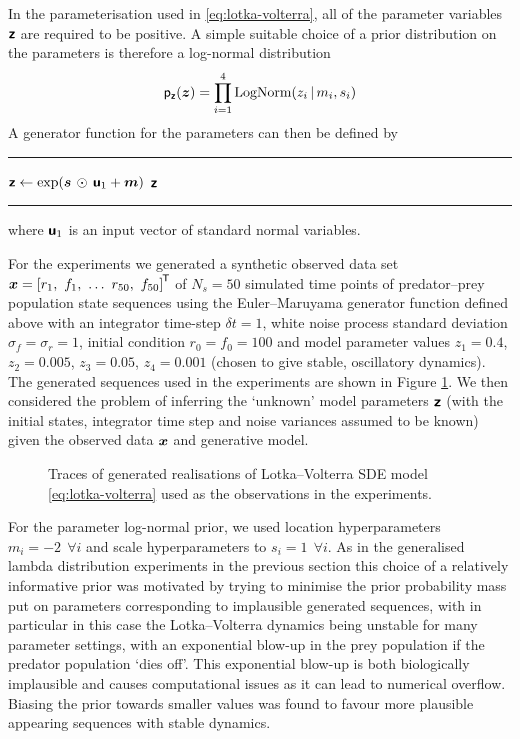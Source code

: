In the parameterisation used in \eqref{eq:lotka-volterra}, all of the parameter variables $\boldsymbol{\mathsf{z}}$ are required to be positive. A simple suitable choice of a prior distribution on the parameters is therefore a log-normal distribution
\begin{equation}
  \mathsf{p}_{\boldsymbol{\mathsf{z}}}(\boldsymbol{z}) = \prod_{i=1}^4 \textrm{LogNorm}(z_i \operatorname{|} m_i, s_i)
\end{equation}
A generator function for the parameters can then be defined by
\vspace{3mm}
\hrule
\begin{algorithmic}
\small
{}
  \State $\boldsymbol{\mathsf{z}} \gets \exp(\boldsymbol{s} \,\odot\, \boldsymbol{\mathsf{u}}_1 + \boldsymbol{m})$
  \State \Return $\boldsymbol{\mathsf{z}}$
\EndFunction
\end{algorithmic}
\vspace{0mm}
\hrule
\vspace{1mm}
where $\boldsymbol{\mathsf{u}}_1$ is an input vector of standard normal variables.

For the experiments we generated a synthetic observed data set $\vct{x} = \lsb r_1, ~ f_1, ~ \dots ~ {r}_{50}, ~ {f}_{50} \rsb\tr$ of $N_s = 50$ simulated time points of predator--prey population state sequences using the Euler--Maruyama generator function defined above with an integrator time-step $\delta t = 1$, white noise process standard deviation $\sigma_f = \sigma_r = 1$, initial condition $r_0 = f_0 = 100$ and model parameter values ${z}_1=0.4$, ${z}_2 = 0.005$,  ${z}_3=0.05$, ${z}_4=0.001$ (chosen to give stable, oscillatory dynamics). The generated sequences used in the experiments are shown in Figure \ref{fig:lotka-volterra-observed-state-seq}. We then considered the problem of inferring the `unknown' model parameters $\boldsymbol{\mathsf{z}}$ (with the initial states, integrator time step and noise variances assumed to be known) given the observed data $\boldsymbol{x}$ and generative model. 

\begin{figure}[t]
\centering
{}
\vspace{-5mm}
\caption[Generated Lotka--Volterra sequences.]{Traces of generated realisations of Lotka--Volterra \ac{SDE} model \eqref{eq:lotka-volterra} used as the observations in the experiments.}
\label{fig:lotka-volterra-observed-state-seq}
\end{figure}

For the parameter log-normal prior, we used location hyperparameters $m_i = -2 ~~\forall i$ and scale hyperparameters to $s_i = 1 ~~\forall i$. As in the generalised lambda distribution experiments in the previous section this choice of a relatively informative prior was motivated by trying to minimise the prior probability mass put on parameters corresponding to implausible generated sequences, with in particular in this case the Lotka--Volterra dynamics being unstable for many parameter settings, with an exponential blow-up in the prey population if the predator population `dies off'. This exponential blow-up is both biologically implausible and causes computational issues as it can lead to numerical overflow. Biasing the prior towards smaller values was found to favour more plausible appearing sequences with stable dynamics.

